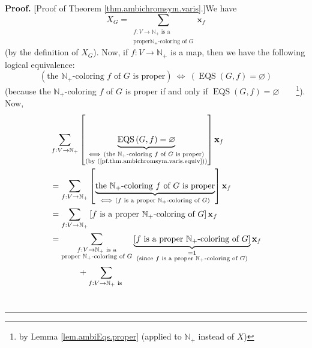 \documentclass[numbers=enddot,12pt,final,onecolumn,notitlepage]{scrartcl}%
\theoremstyle{definition}
\newenvironment{proof}[1][Proof]{\noindent\textbf{#1.} }{\ \rule{0.5em}{0.5em}}
\newenvironment{verlong}{}{}
\let\sumnonlimits\sum
\renewcommand{\sum}{\sumnonlimits\limits}
\begin{document}
\begin{verlong}
\begin{proof}
[Proof of Theorem \ref{thm.ambichromsym.varis}.]We have%
\begin{equation}
X_{G}=\sum_{\substack{f:V\rightarrow\mathbb{N}_{+}\text{ is a}\\\text{proper
}\mathbb{N}_{+}\text{-coloring of }G}}\mathbf{x}_{f}
\label{pf.thm.ambichromsym.varis.XG-def}%
\end{equation}
(by the definition of $X_{G}$). Now, if $f:V\rightarrow\mathbb{N}_{+}$ is a
map, then we have the following logical equivalence:%
\begin{equation}
\left(  \text{the }\mathbb{N}_{+}\text{-coloring }f\text{ of }G\text{ is
proper}\right)  \ \Longleftrightarrow\ \left(  \operatorname*{EQS}\left(
G,f\right)  =\varnothing\right)  \label{pf.thm.ambichromsym.varis.equiv}%
\end{equation}
(because the $\mathbb{N}_{+}$-coloring $f$ of $G$ is proper if and only if
$\operatorname*{EQS}\left(  G,f\right)  =\varnothing$\ \ \ \ \footnote{by
Lemma \ref{lem.ambiEqs.proper} (applied to $\mathbb{N}_{+}$ instead of $X$)}).
Now,%
\begin{align}
&  \sum_{f:V\rightarrow\mathbb{N}_{+}}\left[  \underbrace{\operatorname*{EQS}%
\left(  G,f\right)  =\varnothing}_{\substack{\Longleftrightarrow\ \left(
\text{the }\mathbb{N}_{+}\text{-coloring }f\text{ of }G\text{ is
proper}\right)  \\\text{(by (\ref{pf.thm.ambichromsym.varis.equiv}))}%
}}\right]  \mathbf{x}_{f}\nonumber\\
&  =\sum_{f:V\rightarrow\mathbb{N}_{+}}\left[  \underbrace{\text{the
}\mathbb{N}_{+}\text{-coloring }f\text{ of }G\text{ is proper}}%
_{\Longleftrightarrow\ \left(  f\text{ is a proper }\mathbb{N}_{+}%
\text{-coloring of }G\right)  }\right]  \mathbf{x}_{f}\nonumber\\
&  =\sum_{f:V\rightarrow\mathbb{N}_{+}}\left[  f\text{ is a proper }%
\mathbb{N}_{+}\text{-coloring of }G\right]  \mathbf{x}_{f}\nonumber\\
&  =\sum_{\substack{f:V\rightarrow\mathbb{N}_{+}\text{ is a}\\\text{proper
}\mathbb{N}_{+}\text{-coloring of }G}}\underbrace{\left[  f\text{ is a proper
}\mathbb{N}_{+}\text{-coloring of }G\right]  }_{\substack{=1\\\text{(since
}f\text{ is a proper }\mathbb{N}_{+}\text{-coloring of }G\text{)}}%
}\mathbf{x}_{f}\nonumber\\
&  \ \ \ \ \ \ \ \ \ \ +\sum_{\substack{f:V\rightarrow\mathbb{N}_{+}\text{ is
}}}
\end{align}
\end{proof}
\end{verlong}
\end{document}
